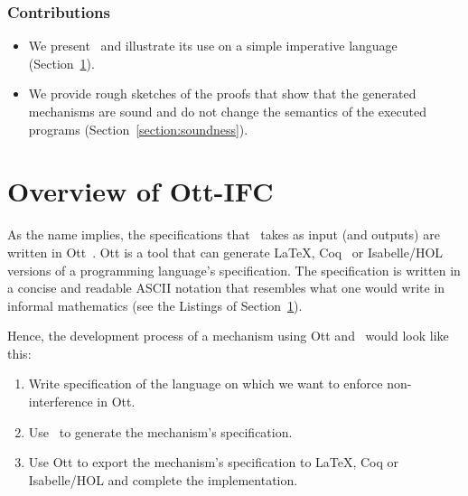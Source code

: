 \documentclass[conference]{IEEEtran}
\begin{document}
\subsubsection*{Contributions}
\begin{itemize}
	\item We present \ottifc\ and illustrate its use on a simple imperative language (Section~\ref{section:ott-ifc}).
	\item We provide rough sketches of the proofs that show that the generated mechanisms are sound and do not change the semantics of the executed programs (Section~\ref{section:soundness}).
\end{itemize}

\section{Overview of Ott-IFC}\label{section:ott-ifc}
As the name implies, the specifications that \ottifc\ takes as input (and outputs) are written in Ott~\cite{DBLP:journals/jfp/SewellNOPRSS10, Ott}. Ott is a tool that can generate LaTeX, Coq~\cite{Coq} or Isabelle/HOL~\cite{IsabelleHOL} versions of a programming language's specification. The specification is written in a concise and readable ASCII notation that resembles what one would write in informal mathematics (see the Listings of Section~\ref{section:ott-ifc}).

Hence, the development process of a mechanism using Ott and \ottifc\ would look like this:
\begin{enumerate}
  \item Write specification of the language on which we want to enforce non-interference in Ott.
  \item Use \ottifc\ to generate the mechanism's specification.
  \item Use Ott to export the mechanism's specification to LaTeX, Coq or Isabelle/HOL and complete the implementation.
\end{enumerate}
\end{document}
